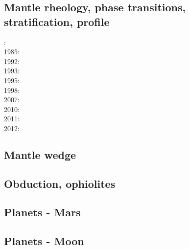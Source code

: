 \subsection*{Mantle rheology, phase transitions, stratification, profile}

: \cite{yusb82}\cite{chri82}\\
1985: \cite{chyu85}\\
1992: \cite{zhyh92}\\
1993: \cite{tasg93}\\
1995: \cite{zhyu95}\\
1998: \cite{cava98}\\
2007: \cite{pazw07}\\
2010: \cite{kayy10}\\
2011: \cite{java11}\\
2012: \cite{tack12}

\subsection*{Mantle wedge}

\noindent
\cite{tosl78}
\cite{bigu01}
\cite{knva08}
\cite{leki09}
\cite{roms10}
\cite{ledg14}

\subsection*{Obduction, ophiolites}

\noindent
\cite{hack90}
\cite{hack91}
\cite{agzf14}

\subsection*{Planets - Mars}

\cite{scbg90}
\cite{nist01}
\cite{vavv05}
\cite{seki14}
\cite{zhon16}

\subsection*{Planets - Moon}

\cite{zhdv19}

